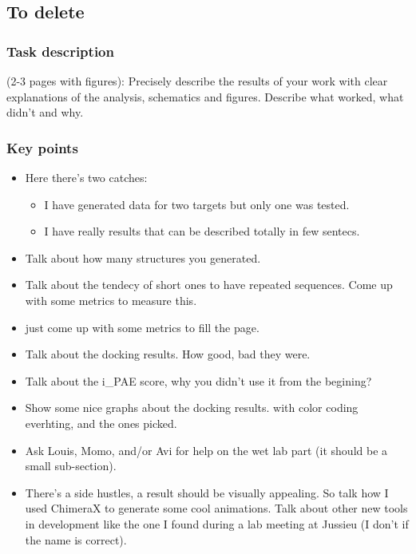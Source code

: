 \documentclass[11pt,a4paper]{article}
\begin{document}
\subsection{To delete}

\subsubsection{Task description}
(2-3 pages with figures):
Precisely describe the results of your work with clear explanations of 
the analysis, schematics and figures.
Describe what worked, what didn't and why.

\subsubsection{Key points}


\begin{itemize}
    \item Here there's two catches:
    \begin{itemize}
        \item I have generated data for two targets but only one was 
        tested.
        \item I have really results that can be described totally in 
        few sentecs.
    \end{itemize}
    \item Talk about how many structures you generated.
    \item Talk about the tendecy of short ones to have repeated 
    sequences. Come up with some metrics to measure this.
    \item just come up with some metrics to fill the page.
    \item Talk about the docking results. How good, bad they were.
    \item Talk about the i\_PAE score, why you didn't use it from the 
    begining?
    \item Show some nice graphs about the docking results. with color 
    coding everhting, and the ones picked.
    \item Ask Louis, Momo, and/or Avi for help on the wet lab part (it 
    should be a small sub-section).
    \item There's a side hustles, a result should be visually 
    appealing. So talk how I used ChimeraX to generate some cool 
    animations. Talk about other new tools in development like the one 
    I found during a lab meeting at Jussieu (I don't if the name is 
    correct). 
\end{itemize}
\end{document}
